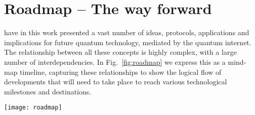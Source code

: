 %
%

\part{Roadmap -- The way forward}

 have in this work presented a vast number of ideas, protocols, applications and implications for future quantum technology, mediated by the quantum internet. The relationship between all these concepts is highly complex, with a large number of interdependencies. In Fig.~\ref{fig:roadmap} we express this as a mind-map timeline, capturing these relationships to show the logical flow of developments that will need to take place to reach various technological milestones and destinations.

\begin{figure*}
	\texttt{[image: roadmap]}
	\caption{Relationships and dependencies in the development and deployment of the major concepts in the quantum internet, showing the logical flow of developments that will need to take place to reach various technological milestones and destinations.}\label{fig:roadmap}
\end{figure*}
